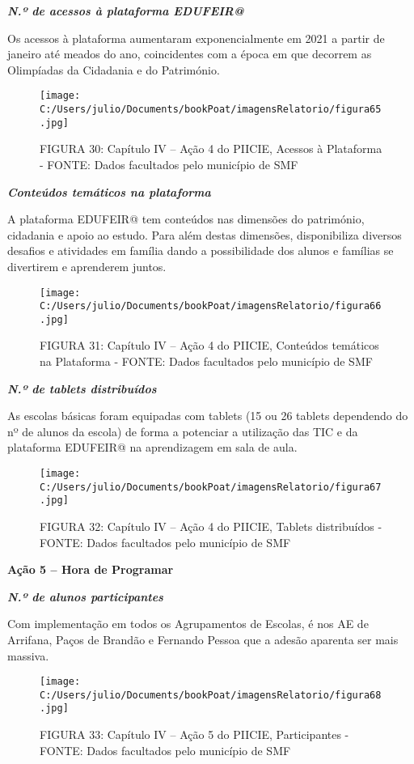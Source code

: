 \documentclass[
]{book}
\begin{document}
\textbf{\emph{N.º de acessos à plataforma EDUFEIR@}}

Os acessos à plataforma aumentaram exponencialmente em 2021 a partir de janeiro até meados do ano, coincidentes com a época em que decorrem as Olimpíadas da Cidadania e do Património.

\begin{figure}
\centering
\texttt{[image: C:/Users/julio/Documents/bookPoat/imagensRelatorio/figura65.jpg]}
\caption{FIGURA 30: Capítulo IV -- Ação 4 do PIICIE, Acessos à Plataforma - FONTE: Dados facultados pelo município de SMF}
\end{figure}

\textbf{\emph{Conteúdos temáticos na plataforma}}

A plataforma EDUFEIR@ tem conteúdos nas dimensões do património, cidadania e apoio ao estudo. Para além destas dimensões, disponibiliza diversos desafios e atividades em família dando a possibilidade dos alunos e famílias se divertirem e aprenderem juntos.

\begin{figure}
\centering
\texttt{[image: C:/Users/julio/Documents/bookPoat/imagensRelatorio/figura66.jpg]}
\caption{FIGURA 31: Capítulo IV -- Ação 4 do PIICIE, Conteúdos temáticos na Plataforma - FONTE: Dados facultados pelo município de SMF}
\end{figure}

\textbf{\emph{N.º de tablets distribuídos}}

As escolas básicas foram equipadas com tablets (15 ou 26 tablets dependendo do nº de alunos da escola) de forma a potenciar a utilização das TIC e da plataforma EDUFEIR@ na aprendizagem em sala de aula.

\begin{figure}
\centering
\texttt{[image: C:/Users/julio/Documents/bookPoat/imagensRelatorio/figura67.jpg]}
\caption{FIGURA 32: Capítulo IV -- Ação 4 do PIICIE, Tablets distribuídos - FONTE: Dados facultados pelo município de SMF}
\end{figure}

\textbf{Ação 5 -- Hora de Programar}

\textbf{\emph{N.º de alunos participantes}}

Com implementação em todos os Agrupamentos de Escolas, é nos AE de Arrifana, Paços de Brandão e Fernando Pessoa que a adesão aparenta ser mais massiva.

\begin{figure}
\centering
\texttt{[image: C:/Users/julio/Documents/bookPoat/imagensRelatorio/figura68.jpg]}
\caption{FIGURA 33: Capítulo IV -- Ação 5 do PIICIE, Participantes - FONTE: Dados facultados pelo município de SMF}
\end{figure}
\end{document}
